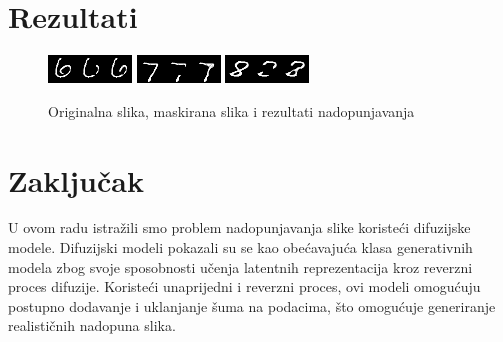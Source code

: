 \documentclass[10pt, a4paper, croatian]{article}
\begin{document}
\section{Rezultati}
\begin{figure}
	\begin{center}
	\includegraphics[width=\columnwidth]{../repaint_output/inpainted_combined_6.png}
	\includegraphics[width=\columnwidth]{../repaint_output/inpainted_combined_7.png}
	\includegraphics[width=\columnwidth]{../repaint_output/inpainted_combined_8.png}
	\caption{Originalna slika, maskirana slika i rezultati nadopunjavanja}
	\label{fig:figure1}
	\end{center}
\end{figure}

\section{Zaključak}

U ovom radu istražili smo problem nadopunjavanja slike koristeći difuzijske modele. Difuzijski modeli pokazali su se kao obećavajuća klasa generativnih modela zbog svoje sposobnosti učenja latentnih reprezentacija kroz reverzni proces difuzije. Koristeći unaprijedni i reverzni proces, ovi modeli omogućuju postupno dodavanje i uklanjanje šuma na podacima, što omogućuje generiranje realističnih nadopuna slika.
\end{document}
